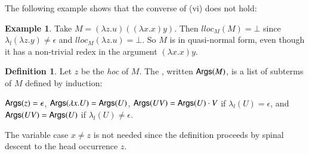 \documentclass{elsarticle}
\newif\iflongversion
\theoremstyle{plain}
\newtheorem{property}[theorem]{Property}
\theoremstyle{definition}
\newtheorem{definition}{Definition}[section]
\newtheorem{example}{Example}[section]
\begin{document}
The following example shows that the converse of (vi) does not hold:
\begin{example}
Take $M= (\lambda z.u)((\lambda x . x) y)$. Then $lloc_M(M) = \bot$ since $\lambda_l(\lambda z.y)\ne\epsilon$ and $lloc_M(\lambda z.u) = \bot$.
So $M$ is in quasi-normal form, even though it has a non-trivial redex in the argument $(\lambda x . x) y$.
\end{example}

\begin{definition}%
Let $z$ be the \emph{hoc} of $M$.
The , written ${\sf Args}(M)$, is a list of subterms of $M$ defined by induction:
\iflongversion
\begin{align*}
    & \begin{array}{ll}
        {\sf Args}(z) &= \epsilon \\
        {\sf Args}(\lambda x . U ) &= {\sf Args}(U)
    \end{array}
&
{\sf Args}(U V) &=
    \begin{cases}
        {\sf Args}(U) \cdot V & \mbox{if } \lambda_l(U) = \epsilon, \\
        {\sf Args}(U)         & \mbox{if } \lambda_l(U) \neq \epsilon.
    \end{cases}
\end{align*}
\else
${\sf Args}(z) = \epsilon$,
${\sf Args}(\lambda x . U ) = {\sf Args}(U)$,
${\sf Args}(U V) =
{\sf Args}(U) \cdot V$  if $\lambda_l(U) = \epsilon$,
 and ${\sf Args}(U V) = {\sf Args}(U)$
 if $\lambda_l(U) \neq \epsilon$.
\fi
The variable case $x\neq z$ is not needed since the definition proceeds by spinal descent to the head occurrence $z$.
\end{definition}

\iflongversion
\begin{property}
\label{property:hoc_argument_count_in_headnf}
    If $M$ is in quasi-head-normal form, then the head variable of its head-normal form has precisely $|{\sf Args}(M)|$ arguments.
\end{property}
\begin{proof}
By Theorem~\ref{thm:danosregnier_headlinred}, the \emph{hoc} of a quasi-head normal form becomes the head variable of the head-normal form after reducing the prime redexes, and it is easy to show by structural induction that standard beta-reduction preserves the number of pending hoc arguments.
\end{proof}
\fi
\end{document}
